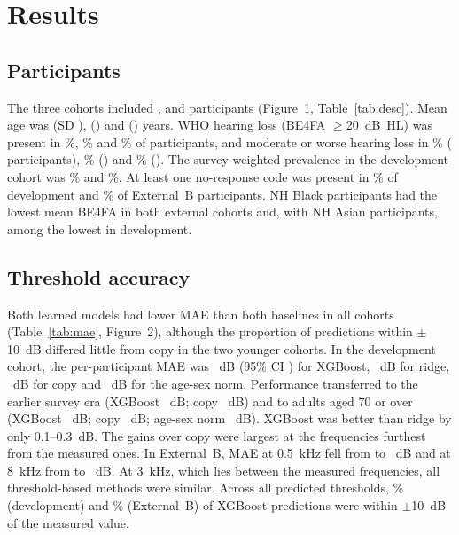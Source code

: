 \documentclass[11pt]{article}
\begin{document}
\section*{Results}

\subsection*{Participants}
The three cohorts included \NDev{}, \NExtA{} and \NExtB{} participants (Figure~1, Table~\ref{tab:desc}). Mean age was \AgeDev{} (SD \AgeSdDev{}), \AgeExtA{} (\AgeSdExtA{}) and \AgeExtB{} (\AgeSdExtB{}) years. WHO hearing loss (BE4FA $\geq$20~dB~HL) was present in \PrevTwentyDev{}\%, \PrevTwentyExtA{}\% and \PrevTwentyExtB{}\% of participants, and moderate or worse hearing loss in \PrevThirtyFiveDev{}\% (\NThirtyFiveDev{} participants), \PrevThirtyFiveExtA{}\% (\NThirtyFiveExtA{}) and \PrevThirtyFiveExtB{}\% (\NThirtyFiveExtB{}). The survey-weighted prevalence in the development cohort was \PrevTwentyDevW{}\% and \PrevThirtyFiveDevW{}\%. At least one no-response code was present in \NoRespDev{}\% of development and \NoRespExtB{}\% of External~B participants. NH Black participants had the lowest mean BE4FA in both external cohorts and, with NH Asian participants, among the lowest in development.

\subsection*{Threshold accuracy}
Both learned models had lower MAE than both baselines in all cohorts (Table~\ref{tab:mae}, Figure~2), although the proportion of predictions within $\pm$10~dB differed little from copy in the two younger cohorts. In the development cohort, the per-participant MAE was \MaeXgbDev{}~dB (95\% CI \MaeCiXgbDev{}) for XGBoost, \MaeRidgeDev{}~dB for ridge, \MaeCopyDev{}~dB for copy and \MaeNormDev{}~dB for the age-sex norm. Performance transferred to the earlier survey era (XGBoost \MaeXgbExtA{}~dB; copy \MaeCopyExtA{}~dB) and to adults aged 70 or over (XGBoost \MaeXgbExtB{}~dB; copy \MaeCopyExtB{}~dB; age-sex norm \MaeNormExtB{}~dB). XGBoost was better than ridge by only 0.1--0.3~dB. The gains over copy were largest at the frequencies furthest from the measured ones. In External~B, MAE at 0.5~kHz fell from \MaeCopyExtBHalf{} to \MaeXgbExtBHalf{}~dB and at 8~kHz from \MaeCopyExtBEight{} to \MaeXgbExtBEight{}~dB. At 3~kHz, which lies between the measured frequencies, all threshold-based methods were similar. Across all predicted thresholds, \WithinTenDev{}\% (development) and \WithinTenExtB{}\% (External~B) of XGBoost predictions were within $\pm$10~dB of the measured value.
\end{document}
